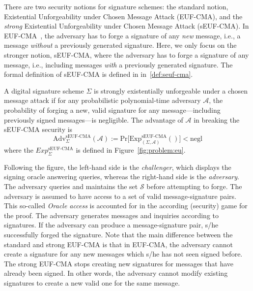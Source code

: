 %
There are two security notions for signature schemes: 
the standard notion, Existential Unforgeability under Chosen Message Attack (EUF-CMA), 
and the \emph{strong} Existential Unforgeability under Chosen Message Attack (sEUF-CMA). 
%
%
In EUF-CMA~\cite{goldwasser1988digital}, the adversary has to forge a signature of
any \emph{new} message, i.e., a message \emph{without} a
previously generated signature.
%
Here, we only focus on the stronger notion, sEUF-CMA, where the adversary
has to forge a signature of any message, i.e., including messages
\emph{with} a previously generated 
signature. 
%
The formal definition of sEUF-CMA is defined in in~\ref{def:seuf-cma}.
%
\begin{definition}\label{def:seuf-cma}
  A digital signature scheme $\Sigma$ is strongly
  existentially unforgeable	under a chosen message attack if for any
  probabilistic polynomial-time adversary $\mathcal{A}$,
  the probability of forging a new, valid signature for any message—including previously 
  signed messages—is negligible. 
  The advantage of $\mathcal{A}$ in breaking the sEUF-CMA security is
%
  \[
  \text{Adv}_{\Sigma}^{\text{sEUF-CMA}} (\mathcal{A}) :=
  \text{Pr}\big[ \text{Exp}_{(\Sigma,\mathcal{A})}^{\text{sEUF-CMA}}()\big]< \text{negl}
  \]
  where the \(Exp_{\Sigma}^{\text{sEUF-CMA}}\) is defined in Figure~\ref{fig:problem:eu}. 
\end{definition}
%
Following the figure, the left-hand side is the \emph{challenger}, 
which displays the signing oracle answering queries, whereas the right-hand side is the \emph{adversary}.
%
The adversary queries and maintains the set $\mathcal{S}$ before attempting to forge. 
%
The adversary is assumed to have access to a set of valid message-signature pairs.
%
This so-called \emph{Oracle access} is accounted for in the
according (security) game for the proof.
%
The adversary generates messages and inquiries according to signatures.
%
If the adversary can produce a message-signature pair,
 s/he successfully forged the signature.
%
%
%
Note that the main difference between the standard and strong EUF-CMA is that in EUF-CMA, the adversary cannot create a 
signature for any new messages which s/he has not seen signed before. 
%
The strong EUF-CMA stops creating new signatures for 
messages that have already been signed.
%
In other words, the adversary cannot modify 
existing signatures to create a new valid one for the same message. 
%

